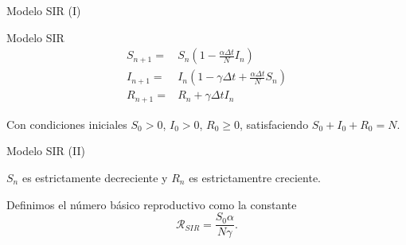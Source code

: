 \begin{frame}{Modelo SIR (I)}

    \begin{block}{Modelo SIR \cite{allenDiscretetimeSISIR1994}\cite{brauerMathematicalModelsPopulation2012}\cite{salinelliDiscreteDynamicalModels2014}}
        \begin{equation}
        \label{eqn: SIR_modelo}
        \begin{aligned}
        S_{n+1} = & S_n \left(1-\frac{\alpha\Delta t}{N} I_n \right) \\
        I_{n+1} = & I_n \left( 1-\gamma \Delta t + \frac{\alpha\Delta t}{N} S_n \right) \\
        R_{n+1} = & R_n + \gamma \Delta t I_n
        \end{aligned}
        \end{equation}
        
        Con condiciones iniciales $S_0>0$, $I_0>0$, $R_0\geq 0$, satisfaciendo $S_0+I_0+R_0=N$.
    \end{block}

    \begin{center}
        \end{center}

\end{frame}


\begin{frame}{Modelo SIR (II)}

        \begin{lema}
            $S_n$ es estrictamente decreciente y $R_n$ es estrictamentre creciente.
        \end{lema}

        \pause

        \begin{definicion}
            Definimos el número básico reproductivo como la constante 
            $$\mathcal{R}_{SIR}=\frac{S_0 \alpha}{N\gamma }.$$
        \end{definicion}

\end{frame}


